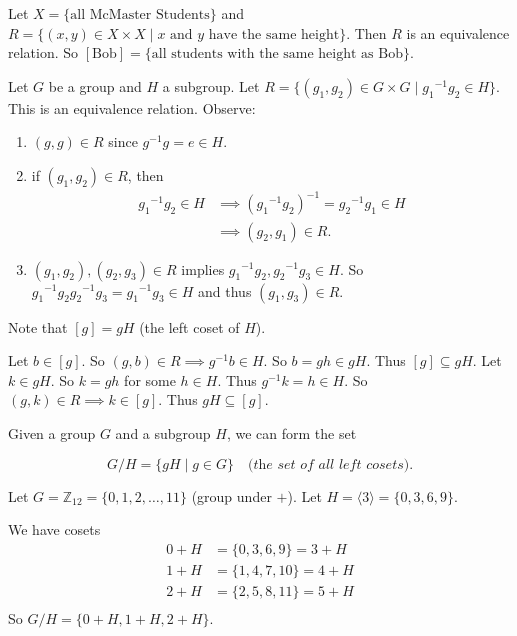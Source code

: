 \begin{example}
	Let $X=\{\text{all McMaster Students}\}$ and $R=\{(x,y)\in X\times X\mid\text{$x$ and $y$ have the same height}\}$. Then $R$ is an equivalence relation. So $[\text{Bob}]=\{\text{all students with the same height as Bob}\}$.
\end{example}

\begin{example}
	Let $G$ be a group and $H$ a subgroup. Let $R=\{(g_1,g_2)\in G\times G\mid {g_1}^{-1}g_2\in H\}$. This is an equivalence relation. Observe:
	\begin{enumerate}[label=\textbf{(\alph*)}]
		\item $(g,g)\in R$ since $g^{-1}g=e\in H$.
		\item if $(g_1,g_2)\in R$, then
		\begin{align*}
			{g_1}^{-1}g_2\in H&\implies ({g_1}^{-1}g_2)^{-1}={g_2}^{-1}g_1\in H\\
			&\implies (g_2,g_1)\in R.
		\end{align*}
		\item $(g_1,g_2),(g_2,g_3)\in R$ implies ${g_1}^{-1}g_2,{g_2}^{-1}g_3\in H$. So ${g_1}^{-1}g_2{g_2}^{-1}g_3={g_1}^{-1}g_3\in H$ and thus $(g_1,g_3)\in R$.
	\end{enumerate}
\end{example}

Note that $[g]=gH$ (the left coset of $H$).

Let $b\in[g]$. So $(g,b)\in R\implies g^{-1}b\in H$. So $b=gh\in gH$. Thus $[g]\subseteq gH$. Let $k\in gH$. So $k=gh$ for some $h\in H$. Thus $g^{-1}k=h\in H$. So $(g,k)\in R\implies k\in[g]$. Thus $gH\subseteq [g]$.

Given a group $G$ and a subgroup $H$, we can form the set

$$G/H=\{gH\mid g\in G\}\quad \textit{(the set of all left cosets)}.$$

\begin{example}
	Let $G=\mathbb Z_{12}=\{0,1,2,\hdots,11\}$ (group under $+$). Let $H=\langle 3\rangle=\{0,3,6,9\}$.

	We have cosets
	\begin{align*}
		0+H&=\{0,3,6,9\}=3+H\\
		1+H&=\{1,4,7,10\}=4+H\\
		2+H&=\{2,5,8,11\}=5+H\\
	\end{align*}
	So $G/H=\{0+H,1+H,2+H\}$.
\end{example}


